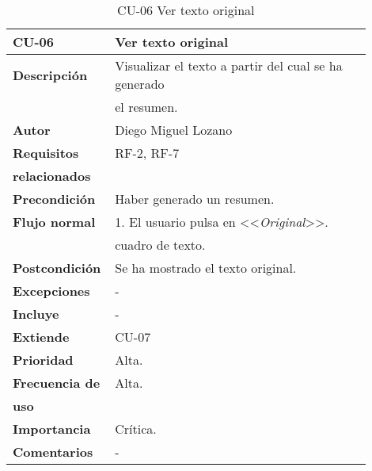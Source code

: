 \begin{longtable}{>{\raggedright}b{0.2\linewidth}>{\raggedright\arraybackslash}b{0.7\linewidth}}
	\toprule
	\textbf{CU-06} & \textbf{Ver texto original} \\
	\toprule
	\endhead
	
	\toprule
	\caption{CU-06 Ver texto original}
	\endfoot
	
	\small{\textbf{Descripción}} & Visualizar el texto a partir del cual se ha generado \\
	& el resumen. \\
	\small{\textbf{Autor}} & Diego Miguel Lozano \\
	\small{\textbf{Requisitos}} & RF-2, RF-7  \\
	\small{\textbf{relacionados}} & \\
	\small{\textbf{Precondición}} & Haber generado un resumen. \\
	\small{\textbf{Flujo normal}} & \quad \small{1. El usuario pulsa en <<\emph{Original}>>. } \\
	& \qquad \small{cuadro de texto.} \\
	\small{\textbf{Postcondición}} & Se ha mostrado el texto original.\\
	\small{\textbf{Excepciones}} & - \\
	\small{\textbf{Incluye}} & - \\
	\small{\textbf{Extiende}} & CU-07 \\
	\small{\textbf{Prioridad}} & Alta. \\
	\small{\textbf{Frecuencia de}} & Alta. \\
	\small{\textbf{uso}} & \\
	\small{\textbf{Importancia}} & Crítica. \\
	\small{\textbf{Comentarios}} & - \\
\end{longtable}



